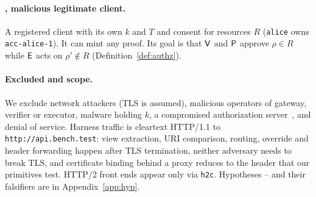 \paragraph{\Aclient, malicious legitimate client.} A registered client with
its own $k$ and $T$ and consent for resources $R$ (\texttt{alice} owns
\texttt{acc-alice-1}). It can mint any proof. Its goal is that $\mathsf{V}$ and
$\mathsf{P}$ approve $\rho\in R$ while $\mathsf{E}$ acts on $\rho'\notin R$
(Definition~\ref{def:authz}).

\paragraph{Excluded and scope.} We exclude network attackers (TLS is
assumed), malicious operators of gateway, verifier or executor, malware
holding $k$, a compromised authorization server~\cite{hosseyni2024csf}, and
denial of service. Harness traffic is cleartext HTTP/1.1 to
\texttt{http://api.bench.test}: view extraction, URI comparison, routing,
override and header forwarding happen after TLS termination, neither
adversary needs to break TLS, and certificate binding behind a proxy reduces
to the header that our \GC primitives test. HTTP/2 front ends appear only via
\texttt{h2c}. Hypotheses -- and their falsifiers are in
Appendix~\ref{app:hyp}.
